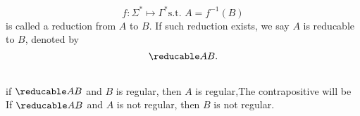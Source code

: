 \begin{definition}
    \[
        f \colon \Sigma^* \mapsto \Gamma^* \text{s.t.\ } A = f^{-1}(B)
    \]
    is called a reduction from $A$ to $B$. If such reduction exists, we say $A$ is
    reducable to $B$, denoted by
    \[
        \reducable AB.
    \]
\end{definition}

\begin{theorem}[]\ \\
    if $\reducable AB$ and $B$ is regular, then $A$ is regular,The contrapositive will be \\
    If $\reducable AB$ and $A$ is not regular, then $B$ is not regular.
\end{theorem}




